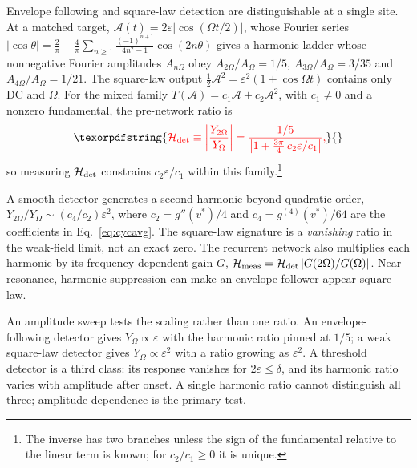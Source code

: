 \documentclass[11pt,a4paper]{article}
\newcommand{\half}{\tfrac{1}{2}}
\providecommand{\DIFdeltex}[1]{{\protect\color{red} \scriptsize #1}} %
\providecommand{\DIFdel}[1]{\texorpdfstring{\DIFdeltex{#1}}{}} %
\begin{document}
\DIFdel{Envelope following and square-law detection are distinguishable at a single site. At a matched target,
$\mathcal A(t)=2\varepsilon|\cos(\Omega t/2)|$, whose Fourier series
$|\cos\theta|=\tfrac2\pi+\tfrac4\pi\sum_{n\ge1}\tfrac{(-1)^{n+1}}{4n^2-1}\cos(2n\theta)$ gives a
harmonic ladder whose nonnegative Fourier amplitudes $A_{n\Omega}$ obey $A_{2\Omega}/A_\Omega=1/5$, $A_{3\Omega}/A_\Omega=3/35$ and
$A_{4\Omega}/A_\Omega=1/21$. The square-law output $\half \mathcal A^2=\varepsilon^2(1+\cos\Omega
t)$ contains only DC and $\Omega$. For the mixed family $T(\mathcal A)=c_1\mathcal A+c_2\mathcal A^2$, with
$c_1\ne0$ and a nonzero fundamental, the
pre-network ratio is
}\begin{displaymath}
\DIFdel{\mathcal H_{\rm det}\equiv\left|\frac{Y_{2\Omega}}{Y_\Omega}\right|
=\frac{1/5}{\left|1+\tfrac{3\pi}{4}\,c_2\varepsilon/c_1\right|},
}\end{displaymath}%
\DIFdel{so measuring $\mathcal H_{\rm det}$ constrains $c_2\varepsilon/c_1$ within this family.}\footnote{\DIFdel{The inverse has two branches unless the sign of the fundamental
relative to the linear term is known; for $c_2/c_1\ge0$ it is unique.}}
\addtocounter{footnote}{-1}%

\DIFdel{A smooth detector generates a second harmonic beyond quadratic order,
$Y_{2\Omega}/Y_\Omega\sim(c_4/c_2)\varepsilon^2$, where
$c_2=g''(v^*)/4$ and $c_4=g^{(4)}(v^*)/64$ are the coefficients in
Eq.~\eqref{eq:cycavg}. The square-law signature is a
\emph{vanishing} ratio in the weak-field limit, not an exact zero. The recurrent
network also multiplies each harmonic by its frequency-dependent gain $G$,
$\mathcal H_{\rm meas}=\mathcal H_{\rm det}\,|G(2\Omega)/G(\Omega)|$.
Near resonance, harmonic suppression can make an envelope follower appear square-law.
}%

\DIFdel{An amplitude sweep tests the scaling rather than one ratio. An
envelope-following detector gives $Y_\Omega\propto\varepsilon$ with the harmonic ratio
pinned at $1/5$; a weak square-law detector gives $Y_\Omega\propto\varepsilon^2$ with a
ratio growing as $\varepsilon^2$. A threshold detector is a third class: its
response vanishes for $2\varepsilon\le\delta$, and its harmonic ratio varies
with amplitude after onset. A single harmonic ratio cannot distinguish all
three; amplitude dependence is the primary test.
}%
\end{document}
